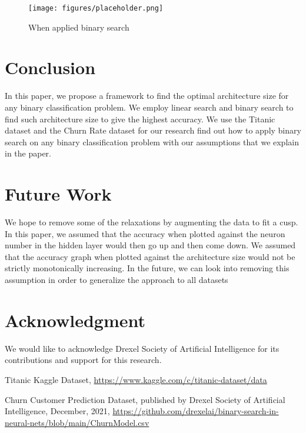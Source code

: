 \documentclass[conference]{IEEEtran}
\begin{document}
\begin{figure}[H]
    \centering
    \texttt{[image: figures/placeholder.png]}
    \setlength{\belowcaptionskip}{-15pt}
    \caption{When applied binary search}
    \label{dnadigest}
\end{figure}



\section{Conclusion}\label{conclusion}

In this paper, we propose a framework to find the optimal architecture size for any binary classification problem. We employ linear search and binary search to find such architecture size to give the highest accuracy. We use the Titanic dataset and the Churn Rate dataset for our research find out how to apply binary search on any binary classification problem with our assumptions that we explain in the paper. 

\section{Future Work}
We hope to remove some of the relaxations by augmenting the data to fit a cusp. In this paper, we assumed that the accuracy when plotted against the neuron number in the hidden layer would then go up and then come down. We assumed that the accuracy graph when plotted against the architecture size would not be strictly monotonically increasing. In the future, we can look into removing this assumption in order to generalize the approach to all datasets


\section*{Acknowledgment}

We would like to acknowledge Drexel Society of Artificial Intelligence for its contributions and support for this research. 


\begin{thebibliography}{00}

 Titanic Kaggle Dataset, \url{https://www.kaggle.com/c/titanic-dataset/data}

Churn Customer Prediction Dataset, published by Drexel Society of Artificial Intelligence, December, 2021, \url{https://github.com/drexelai/binary-search-in-neural-nets/blob/main/ChurnModel.csv}

\end{thebibliography}
\end{document}
